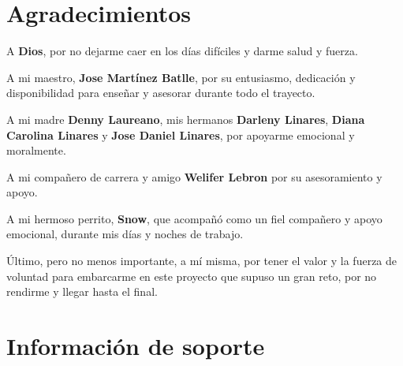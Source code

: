\documentclass[11pt,]{article}
\begin{document}
\section{Agradecimientos}\label{agradecimientos}

A \textbf{Dios}, por no dejarme caer en los días difíciles y darme salud
y fuerza.

A mi maestro, \textbf{Jose Martínez Batlle}, por su entusiasmo,
dedicación y disponibilidad para enseñar y asesorar durante todo el
trayecto.

A mi madre \textbf{Denny Laureano}, mis hermanos \textbf{Darleny
Linares}, \textbf{Diana Carolina Linares} y \textbf{Jose Daniel
Linares}, por apoyarme emocional y moralmente.

A mi compañero de carrera y amigo \textbf{Welifer Lebron} por su
asesoramiento y apoyo.

A mi hermoso perrito, \textbf{Snow}, que acompañó como un fiel compañero
y apoyo emocional, durante mis días y noches de trabajo.

Último, pero no menos importante, a mí misma, por tener el valor y la
fuerza de voluntad para embarcarme en este proyecto que supuso un gran
reto, por no rendirme y llegar hasta el final.

\section{Información de soporte}\label{informaciuxf3n-de-soporte}
\end{document}
